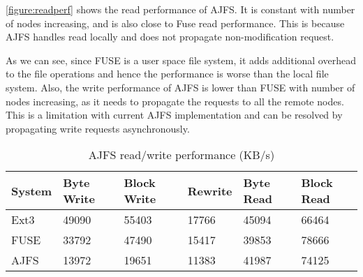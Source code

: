 \ref{figure:readperf} shows the read performance of AJFS. It is constant with number of nodes increasing, and is also close to Fuse read performance.
This is because AJFS handles read locally and does not propagate non-modification request.

As we can see, since FUSE is a user space file system, it adds additional
 overhead to the file operations and hence the performance is worse than the local file system.
Also, the write performance of AJFS is lower than FUSE with number of nodes increasing, as it needs to propagate the requests to all the remote nodes.
 This is a limitation with current AJFS implementation and can be resolved by propagating write requests asynchronously.


\begin{table}[Ht]
\caption{AJFS read/write performance (KB/s)}
\centering
\begin{tabular}{|p{0.9cm}|p{0.9cm}|p{0.9cm}|p{0.9cm}|p{0.9cm}|p{0.9cm}|}
\hline\hline
System & Byte Write & Block Write & Rewrite & Byte Read & Block Read \\
\hline
Ext3	& 49090	& 55403	& 17766	& 45094	& 66464	\\
\hline
FUSE	& 33792	& 47490	& 15417	& 39853	& 78666	\\
\hline
AJFS	& 13972	& 19651	& 11383	& 41987	& 74125	\\
\hline
\end{tabular}
\label{table:performance}
\end{table}

